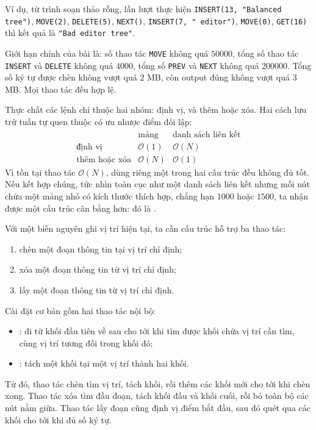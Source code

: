 \documentclass[11pt]{article}
\newcommand{\Oh}{\mathcal{O}}
\begin{document}
Ví dụ, từ trình soạn thảo rỗng, lần lượt thực hiện
\texttt{INSERT(13, "Balanced tree")}, \texttt{MOVE(2)}, \texttt{DELETE(5)},
\texttt{NEXT()}, \texttt{INSERT(7, " editor")}, \texttt{MOVE(0)},
\texttt{GET(16)} thì kết quả là \texttt{"Bad editor tree"}.

Giới hạn chính của bài là: số thao tác \texttt{MOVE} không quá \(50000\), tổng
số thao tác \texttt{INSERT} và \texttt{DELETE} không quá \(4000\), tổng số
\texttt{PREV} và \texttt{NEXT} không quá \(200000\). Tổng số ký tự được chèn
không vượt quá \(2\) MB, còn output đúng không vượt quá \(3\) MB. Mọi thao tác
đều hợp lệ.

Thực chất các lệnh chỉ thuộc hai nhóm: định vị, và thêm hoặc xóa. Hai cách
lưu trữ tuần tự quen thuộc có ưu nhược điểm đối lập:
\[
\begin{array}{c|cc}
 & \text{mảng} & \text{danh sách liên kết}\\
\hline
\text{định vị} & \Oh(1) & \Oh(N)\\
\text{thêm hoặc xóa} & \Oh(N) & \Oh(1)
\end{array}
\]
Vì tồn tại thao tác \(\Oh(N)\), dùng riêng một trong hai cấu trúc đều không
đủ tốt. Nếu kết hợp chúng, tức nhìn toàn cục như một danh sách liên kết nhưng
mỗi nút chứa một mảng nhỏ có kích thước thích hợp, chẳng hạn \(1000\) hoặc
\(1500\), ta nhận được một cấu trúc cân bằng hơn: đó là
.

Với một biến nguyên ghi vị trí hiện tại, ta cần cấu trúc hỗ trợ ba thao tác:
\begin{enumerate}
  \item chèn một đoạn thông tin tại vị trí chỉ định;
  \item xóa một đoạn thông tin từ vị trí chỉ định;
  \item lấy một đoạn thông tin từ vị trí chỉ định.
\end{enumerate}

Cài đặt cơ bản gồm hai thao tác nội bộ:
\begin{itemize}
  \item {}: đi từ khối đầu tiên về sau cho tới khi tìm được khối
  chứa vị trí cần tìm, cùng vị trí tương đối trong khối đó;
  \item {}: tách một khối tại một vị trí thành hai khối.
\end{itemize}
Từ đó, thao tác chèn tìm vị trí, tách khối, rồi thêm các khối mới cho tới khi
chèn xong. Thao tác xóa tìm đầu đoạn, tách khối đầu và khối cuối, rồi bỏ toàn
bộ các nút nằm giữa. Thao tác lấy đoạn cũng định vị điểm bắt đầu, sau đó quét
qua các khối cho tới khi đủ số ký tự.
\end{document}
